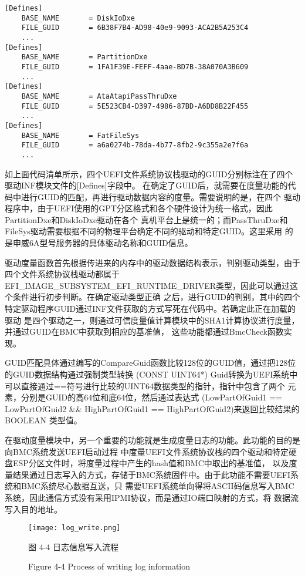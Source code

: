 \begin{lstlisting}
[Defines]
    BASE_NAME       = DiskIoDxe
    FILE_GUID       = 6B38F7B4-AD98-40e9-9093-ACA2B5A253C4
    ...
[Defines]
    BASE_NAME       = PartitionDxe
    FILE_GUID       = 1FA1F39E-FEFF-4aae-BD7B-38A070A3B609
    ...
[Defines]
    BASE_NAME       = AtaAtapiPassThruDxe
    FILE_GUID       = 5E523CB4-D397-4986-87BD-A6DD8B22F455
    ...
[Defines]
    BASE_NAME       = FatFileSys
    FILE_GUID       = a6a0274b-78da-4b77-8fb2-9c355a2e7f6a
    ...
\end{lstlisting}

如上面代码清单所示，四个UEFI文件系统协议栈驱动的GUID分别标注在了四个驱动INF模块文件的[Defines]字段中。
在确定了GUID后，就需要在度量功能的代码中进行GUID的匹配，再进行驱动数据内容的度量。需要说明的是，在四个
驱动程序中，由于UEFI使用的GPT分区格式和各个硬件设计为统一格式，因此PartitionDxe和DiskIoDxe驱动在各个
真机平台上是统一的；而PassThruDxe和FileSys驱动需要根据不同的物理平台确定不同的驱动和特定GUID。这里采用
的是申威6A型号服务器的具体驱动名称和GUID信息\cite{chinese7}。

\par 驱动度量函数首先根据传进来的内存中的驱动数据结构表示，判别驱动类型，由于四个文件系统协议栈驱动都属于
EFI\_IMAGE\_SUBSYSTEM\_EFI\_RUNTIME\_DRIVER类型，因此可以通过这个条件进行初步判断。在确定驱动类型正确
之后，进行GUID的判别，其中的四个特定驱动程序GUID通过INF文件获取的方式写死在代码中。若确定此正在加载的驱动
是四个驱动之一，则通过可信度量值计算模块中的SHA1计算协议进行度量，并通过GUID在BMC中获取到相应的基准值，
这些功能都通过BmcCheck函数实现。
\par GUID匹配具体通过编写的CompareGuid函数比较128位的GUID值，通过把128位的GUID数据结构通过强制类型转换
(CONST UINT64*) Guid转换为UEFI系统中可以直接通过==符号进行比较的UINT64数据类型的指针，指针中包含了两个
元素，分别是GUID的高64位和底64位，然后通过表达式
(LowPartOfGuid1 == LowPartOfGuid2 \&\& HighPartOfGuid1 == HighPartOfGuid2)来返回比较结果的BOOLEAN
类型值。
\par 在驱动度量模块中，另一个重要的功能就是生成度量日志的功能。此功能的目的是向BMC系统发送UEFI启动过程
中度量UEFI文件系统协议栈的四个驱动和特定硬盘ESP分区文件时，将度量过程中产生的hash值和BMC中取出的基准值，
以及度量结果通过日志写入的方式，存储于BMC系统固件中。由于此功能不需要UEFI系统和BMC系统尽心数据互送，只
需要UEFI系统单向得将ASCII码信息写入BMC系统，因此通信方式没有采用IPMI协议，而是通过IO端口映射的方式，将
数据流写入目的地址。

\begin{figure}[htb]
    \vspace{0cm}   
    \setlength{\abovecaptionskip}{0.3cm}
	\centering
    \texttt{[image: log\_write.png]}
    \caption*{图 4-4 日志信息写入流程}
    \setlength{\belowcaptionskip}{-0.7cm}
    \caption*{Figure 4-4 Process of writing log information}
\end{figure}


